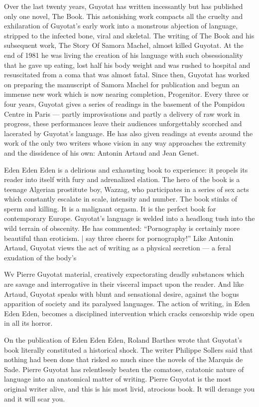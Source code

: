 Over the last twenty years, Guyotat has written incessantly
but has published only one novel, The Book. This astonishing work
compacts all the cruelty and exhilaration of Guyotat's early work into
a monstrous abjection of language, stripped to the infected bone,
viral and skeletal. The writing of The Book and his subsequent work,
The Story Of Samora Machel, almost killed Guyotat. At the end of
1981 he was living the creation of his language with such
obsessionality that he gave up eating, lost half his body weight and
was rushed to hospital and resuscitated from a coma that was almost
fatal. Since then, Guyotat has worked on preparing the manuscript of
Samora Machel for publication and begun an immense new work
which is now nearing completion, Progenitor. Every three or four
years, Guyotat gives a series of readings in the basement of the
Pompidou Centre in Paris — partly improvisations and partly a
delivery of raw work in progress, these performances leave their
audiences unforgettably scorched and lacerated by Guyotat's
language. He has also given readings at events around the work of
the only two writers whose vision in any way approaches the
extremity and the dissidence of his own: Antonin Artaud and Jean
Genet.

Eden Eden Eden is a delirious and exhausting book to
experience: it propels its reader into itself with fury and adrenalized
elation. The hero of the book is a teenage Algerian prostitute boy,
Wazzag, who participates in a series of sex acts which constantly
escalate in scale, intensity and number. The book stinks of sperm
and killing. It is a malignant orgasm. It is the perfect book for
contemporary Europe. Guyotat's language is welded into a headlong
tush into the wild terrain of obscenity. He has commented:
“Pornography is certainly more beautiful than eroticism. | say three
cheers for pornography!” Like Antonin Artaud, Guyotat views the act
of writing as a physical secretion — a feral exudation of the body's

Wv Pierre Guyotat
material, creatively expectorating deadly substances which are
savage and interrogative in their visceral impact upon the reader.
And like Artaud, Guyotat speaks with blunt and sensational desire,
against the bogus apparition of society and its paralysed languages.
The action of writing, in Eden Eden Eden, becomes a disciplined
intervention which cracks censorship wide open in all its horror.

On the publication of Eden Eden Eden, Roland Barthes wrote
that Guyotat's book literally constituted a historical shock. The writer
Philippe Sollers said that nothing had been done that risked so much
since the novels of the Marquis de Sade. Pierre Guyotat has
relentlessly beaten the comatose, catatonic nature of language into
an anatomical matter of writing. Pierre Guyotat is the most original
writer alive, and this is his most livid, atrocious book. It will derange
you and it will scar you.

